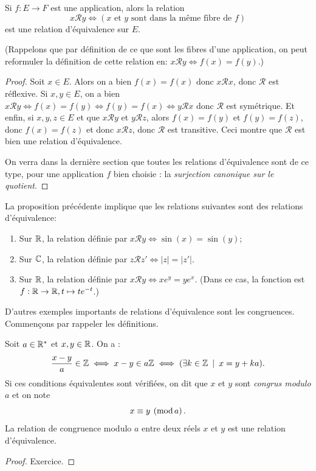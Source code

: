 \begin{proposition}
Si $f : E\to F$ est une application, alors la relation 
\[
x\mathcal R y \iff (x\text{ et }y \text{ sont dans la même fibre de }f)
\]
est une relation d'équivalence sur $E$.

(Rappelons que par définition de ce que sont les fibres d'une application, on peut reformuler la définition de cette relation en: $x\mathcal R y \iff f(x)=f(y)$.)
\end{proposition}
\begin{proof}
Soit $x \in E$.
Alors on a bien $f(x)=f(x)$ donc $x\mathcal R x$, donc $\mathcal R$ est réflexive.
Si $x, y\in E$, on a bien $x\mathcal R y \iff f(x)=f(y) \iff f(y)=f(x) \iff y\mathcal R x$ donc $\mathcal R$ est symétrique.
Et enfin, si $x,y,z\in E$ et que $x\mathcal R y$ et $y\mathcal R z$, alors $f(x)=f(y)$ et $f(y)=f(z)$, donc $f(x)=f(z)$ et donc $x\mathcal R z$, donc $\mathcal R$ est transitive.
Ceci montre que $\mathcal R$ est bien une relation d'équivalence.

On verra dans la dernière section que toutes les relations d'équivalence sont de ce type, pour une application $f$ bien choisie : la \emph{surjection canonique sur le quotient}.
\end{proof}

\begin{exemple} La proposition précédente implique que les relations suivantes sont des relations d'équivalence:
\begin{enumerate}
\item Sur $\mathbb{R}$, la relation définie par $x\mathcal R y \iff \sin(x)=\sin(y)$;
\item Sur $\mathbb{C}$, la relation définie par $z\mathcal R z' \iff |z|=|z'|$.
\item Sur $\mathbb{R}$, la relation définie par $x\mathcal R y \iff xe^y=ye^x$. (Dans ce cas, la fonction est $f :\mathbb{R}\to \mathbb{R}, t\mapsto te^{-t}$.)
\end{enumerate}
\end{exemple}

D'autres exemples importants de relations d'équivalence sont les congruences. Commençons par rappeler les définitions.

\begin{propdef}
Soit $a\in \mathbb{R}^*$ et $x,y\in\mathbb{R}$. On a :
\[
\frac{x-y}{a}\in \Z 
\iff
x-y \in a\Z
\iff 
(\exists k\in \Z\:\mid\: x=y+ka).
\]
Si ces conditions équivalentes sont vérifiées, on dit que $x$ et $y$ sont \emph{congrus modulo $a$} et on note 
\[ x\equiv y \:\left(\operatorname{mod}a\right).\]
La relation de congruence modulo $a$ entre deux réels $x$ et $y$ est une relation d'équivalence.
\end{propdef}
\begin{proof}
Exercice.
\end{proof}

